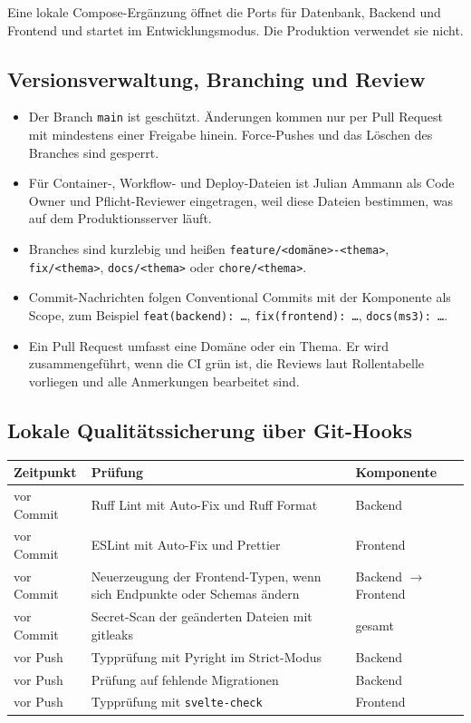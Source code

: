 \documentclass[11pt,a4paper]{article}
\begin{document}
Eine lokale Compose-Ergänzung öffnet die Ports für Datenbank, Backend und Frontend und startet im Entwicklungsmodus. Die Produktion verwendet sie nicht.

\subsection{Versionsverwaltung, Branching und Review}

\begin{itemize}
\item Der Branch \texttt{main} ist geschützt. Änderungen kommen nur per Pull Request mit mindestens einer Freigabe hinein. Force-Pushes und das Löschen des Branches sind gesperrt.
\item Für Container-, Workflow- und Deploy-Dateien ist Julian Ammann als Code Owner und Pflicht-Reviewer eingetragen, weil diese Dateien bestimmen, was auf dem Produktionsserver läuft.
\item Branches sind kurzlebig und heißen \texttt{feature/\allowbreak{}<domäne>-<thema>}, \texttt{fix/\allowbreak{}<thema>}, \texttt{docs/\allowbreak{}<thema>} oder \texttt{chore/\allowbreak{}<thema>}.
\item Commit-Nachrichten folgen Conventional Commits mit der Komponente als Scope, zum Beispiel \texttt{feat(backend): \ldots{}}, \texttt{fix(frontend): \ldots{}}, \texttt{docs(ms3): \ldots{}}.
\item Ein Pull Request umfasst eine Domäne oder ein Thema. Er wird zusammengeführt, wenn die CI grün ist, die Reviews laut Rollentabelle vorliegen und alle Anmerkungen bearbeitet sind.
\end{itemize}


\subsection{Lokale Qualitätssicherung über Git-Hooks}

\begin{tabularx}{\linewidth}{@{}l >{\hsize=1.34\hsize\RaggedRight\arraybackslash}X >{\hsize=0.66\hsize\RaggedRight\arraybackslash}X@{}}
\toprule
\textbf{Zeitpunkt} & \textbf{Prüfung} & \textbf{Komponente} \\
\midrule
\endhead
vor Commit & Ruff Lint mit Auto-Fix und Ruff Format & Backend \\
vor Commit & ESLint mit Auto-Fix und Prettier & Frontend \\
vor Commit & Neuerzeugung der Frontend-Typen, wenn sich Endpunkte oder Schemas ändern & Backend $\rightarrow$ Frontend \\
vor Commit & Secret-Scan der geänderten Dateien mit gitleaks & gesamt \\
vor Push & Typprüfung mit Pyright im Strict-Modus & Backend \\
vor Push & Prüfung auf fehlende Migrationen & Backend \\
vor Push & Typprüfung mit \texttt{svelte-check} & Frontend \\
\bottomrule
\end{tabularx}
\end{document}
